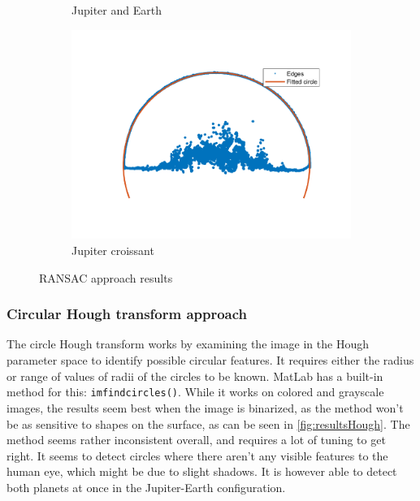 \begin{figure}[!ht]
\begin{subfigure}{0.32\textwidth}
        \caption{Jupiter and Earth}
    \end{subfigure}
    \hfill
    \begin{subfigure}{0.32\textwidth}
        \centering
        \includegraphics[width=\textwidth]{Doc/Graphics/Part3/RANSAC_jupiter_partial.png}
        \caption{Jupiter croissant}
    \end{subfigure}
    \caption{RANSAC approach results}
    \label{fig:resultsRansac}
\end{figure}

\subsubsection{Circular Hough transform approach}

The circle Hough transform works by examining the image in the Hough parameter space to identify possible circular features. It requires either the radius or range of values of radii of the circles to be known. MatLab has a built-in method for this: \texttt{imfindcircles()}. While it works on colored and grayscale images, the results seem best when the image is binarized, as the method won't be as sensitive to shapes on the surface, as can be seen in \autoref{fig:resultsHough}. The method seems rather inconsistent overall, and requires a lot of tuning to get right. It seems to detect circles where there aren't any visible features to the human eye, which might be due to slight shadows. It is however able to detect both planets at once in the Jupiter-Earth configuration.

